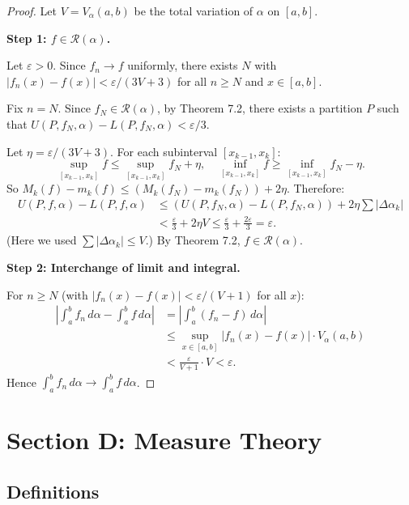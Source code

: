 \documentclass[12pt,a4paper]{article}
\theoremstyle{definition}
\newcommand{\eps}{\varepsilon}
\begin{document}
\begin{proof}
Let $V = V_\alpha(a,b)$ be the total variation of $\alpha$ on $[a,b]$.

\textbf{Step 1: $f \in \mathcal{R}(\alpha)$.}

Let $\eps > 0$. Since $f_n \to f$ uniformly, there exists $N$ with $|f_n(x) - f(x)| < \eps/(3V + 3)$ for all $n \geq N$ and $x \in [a,b]$.

Fix $n = N$. Since $f_N \in \mathcal{R}(\alpha)$, by Theorem 7.2, there exists a partition $P$ such that $U(P, f_N, \alpha) - L(P, f_N, \alpha) < \eps/3$.

Let $\eta = \eps/(3V+3)$. For each subinterval $[x_{k-1}, x_k]$:
\[
    \sup_{[x_{k-1},x_k]} f \leq \sup_{[x_{k-1},x_k]} f_N + \eta, \quad \inf_{[x_{k-1},x_k]} f \geq \inf_{[x_{k-1},x_k]} f_N - \eta.
\]
So $M_k(f) - m_k(f) \leq (M_k(f_N) - m_k(f_N)) + 2\eta$. Therefore:
\begin{align*}
    U(P,f,\alpha) - L(P,f,\alpha) &\leq (U(P,f_N,\alpha) - L(P,f_N,\alpha)) + 2\eta \sum |\Delta\alpha_k| \\
    &< \frac{\eps}{3} + 2\eta V \leq \frac{\eps}{3} + \frac{2\eps}{3} = \eps.
\end{align*}
(Here we used $\sum |\Delta\alpha_k| \leq V$.) By Theorem 7.2, $f \in \mathcal{R}(\alpha)$.

\textbf{Step 2: Interchange of limit and integral.}

For $n \geq N$ (with $|f_n(x) - f(x)| < \eps/(V+1)$ for all $x$):
\begin{align*}
    \left|\int_a^b f_n\,d\alpha - \int_a^b f\,d\alpha\right| &= \left|\int_a^b (f_n - f)\,d\alpha\right| \\
    &\leq \sup_{x \in [a,b]} |f_n(x) - f(x)| \cdot V_\alpha(a,b) \\
    &< \frac{\eps}{V+1} \cdot V < \eps.
\end{align*}
Hence $\int_a^b f_n\,d\alpha \to \int_a^b f\,d\alpha$.
\end{proof}

\newpage
\section{Section D: Measure Theory}

\subsection{Definitions}
\end{document}
